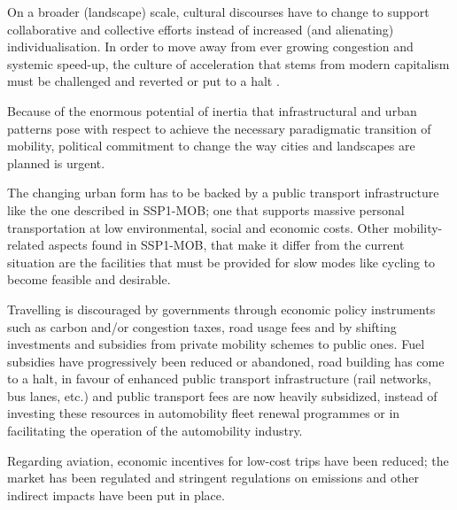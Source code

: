 

On a broader (landscape) scale, cultural discourses have to change to support collaborative and collective efforts instead of increased (and alienating) individualisation. In order to move away from ever growing congestion and systemic speed-up, the culture of acceleration that stems from modern capitalism must be challenged and reverted or put to a halt \textcite{zijlstra2012_SocioSpatialPerspective}.

Because of the enormous potential of inertia that infrastructural and urban patterns pose with respect to achieve the necessary paradigmatic transition of mobility, political commitment to change the way cities and landscapes are planned is urgent.

The changing urban form has to be backed by a public transport infrastructure like the one described in SSP1-MOB; one that supports massive personal transportation at low environmental, social and economic costs. Other mobility-related aspects found in SSP1-MOB, that make it differ from the current situation are the facilities that must be provided for slow modes like cycling to become feasible and desirable.

Travelling is discouraged by governments through economic policy instruments such as carbon and/or congestion taxes, road usage fees and by shifting investments and subsidies from private mobility schemes to public ones. Fuel subsidies have progressively been reduced or abandoned, road building has come to a halt, in favour of enhanced public transport infrastructure (rail networks, bus lanes, etc.) and public transport fees are now heavily subsidized, instead of investing these resources in automobility fleet renewal programmes or in facilitating the operation of the automobility industry.

Regarding aviation, economic incentives for low-cost trips have been reduced; the market has been regulated and stringent regulations on emissions and other indirect impacts have been put in place.